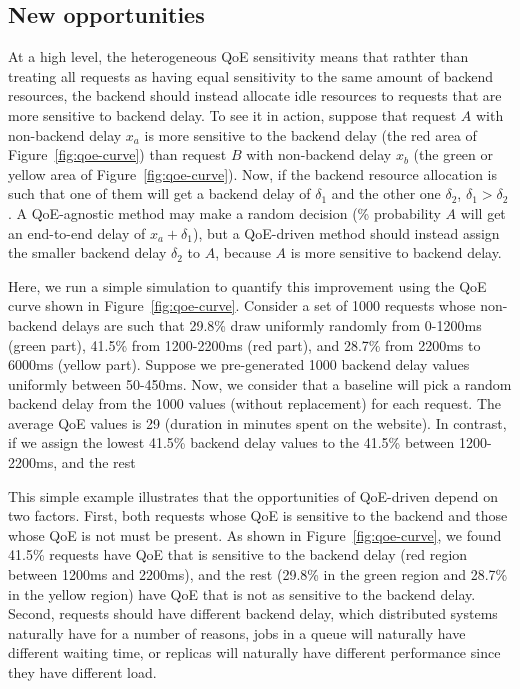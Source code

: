 \subsection{New opportunities}
\label{subsec:opportunities}
At a high level, the heterogeneous QoE sensitivity means that rathter than treating all requests as having equal sensitivity to the same amount of backend resources, the backend should instead allocate idle resources to requests that are more sensitive to backend delay.
To see it in action, suppose that request $A$ with non-backend delay $x_a$ is more sensitive to the backend delay (the red area of Figure~\ref{fig:qoe-curve}) than request $B$ with non-backend delay $x_b$ (the green or yellow area of Figure~\ref{fig:qoe-curve}). Now, if the backend resource allocation is such that one of them will get a backend delay of $\delta_1$ and the other one $\delta_2$, $\delta_1>\delta_2$. A QoE-agnostic method may make a random decision (\% probability $A$ will get an end-to-end delay of $x_a+\delta_1$), but a QoE-driven method should instead assign the smaller backend delay $\delta_2$ to $A$, because $A$ is more sensitive to backend delay.

Here, we run a simple simulation to quantify this improvement using the QoE curve shown in Figure~\ref{fig:qoe-curve}. 
Consider a set of 1000 requests whose non-backend delays are such that 29.8\% draw uniformly randomly from 0-1200ms (green part), 41.5\% from 1200-2200ms (red part), and 28.7\% from 2200ms to 6000ms (yellow part). 
Suppose we pre-generated 1000 backend delay values uniformly between 50-450ms. 
Now, we consider that a baseline will pick a random backend delay from the 1000 values (without replacement) for each request. The average QoE values is 29 (duration in minutes spent on the website).
In contrast, if we assign the lowest 41.5\% backend delay values to the 41.5\% between 1200-2200ms, and the rest 

This simple example illustrates that the opportunities of QoE-driven depend on two factors.
First, both requests whose QoE is sensitive to the backend and those whose QoE is not must be present. As shown in Figure~\ref{fig:qoe-curve}, we found 41.5\% requests have QoE that is sensitive to the backend delay (red region between 1200ms and 2200ms), and the rest (29.8\% in the green region and 28.7\% in the yellow region) have QoE that is not as sensitive to the backend delay.
Second, requests should have different backend delay, which distributed systems naturally have for a number of reasons, \eg jobs in a queue will naturally have different waiting time, or replicas will naturally have different performance since they have different load.

